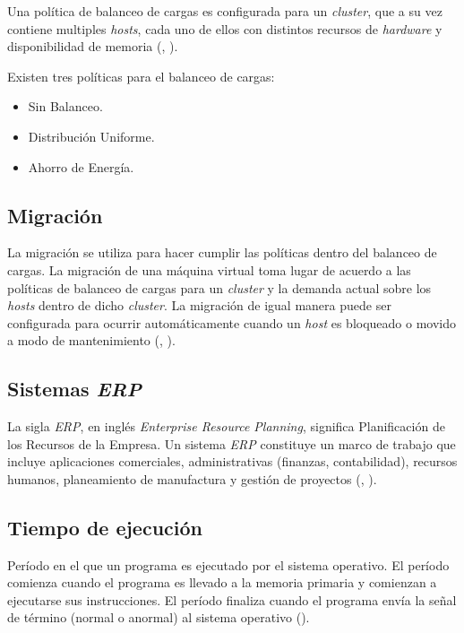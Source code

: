Una pol\'itica de balanceo de cargas es configurada para un \textit{cluster}, que a su vez contiene multiples \textit{hosts}, cada uno de ellos con distintos recursos de \textit{hardware} y disponibilidad de memoria (\citeauthor{redhat}, \citeyear{redhat}). 


Existen tres pol\'iticas para el balanceo de cargas:
\begin{itemize}
	\item Sin Balanceo.
	\item Distribuci\'on Uniforme.
	\item Ahorro de Energ\'ia.
\end{itemize}

\subsection*{Migraci\'on}

La migraci\'on se utiliza para hacer cumplir las pol\'iticas dentro del balanceo de cargas. La migraci\'on de una m\'aquina virtual toma lugar de acuerdo a las pol\'iticas de balanceo de cargas para un \textit{cluster} y la demanda actual sobre los \textit{hosts} dentro de dicho \textit{cluster}. La migraci\'on de igual manera puede ser configurada para ocurrir autom\'aticamente cuando un \textit{host} es bloqueado o movido a modo de mantenimiento (\citeauthor{redhat}, \citeyear{redhat}).

\subsection*{Sistemas \textit{ERP}}

La sigla \textit{ERP}, en ingl\'es \textit{Enterprise Resource Planning}, significa Planificaci\'on de los Recursos de la Empresa. Un sistema \textit{ERP} constituye un marco de trabajo que incluye aplicaciones comerciales, administrativas (finanzas, contabilidad), recursos humanos, planeamiento de manufactura y gesti\'on de proyectos (\citeauthor{saroka2002sistemas}, \citeyear{saroka2002sistemas}). 

\subsection*{Tiempo de ejecución}

Período en el que un programa es ejecutado por el sistema operativo. El período comienza cuando el programa es llevado a la memoria primaria y comienzan a ejecutarse sus instrucciones. El período finaliza cuando el programa envía la señal de término (normal o anormal) al sistema operativo (\cite{redhat}).

